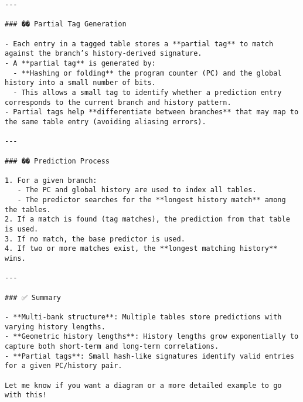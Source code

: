 \documentclass[11pt]{article}
\begin{document}
\begin{verbatim}
---

### �� Partial Tag Generation

- Each entry in a tagged table stores a **partial tag** to match against the branch’s history-derived signature.
- A **partial tag** is generated by:
  - **Hashing or folding** the program counter (PC) and the global history into a small number of bits.
  - This allows a small tag to identify whether a prediction entry corresponds to the current branch and history pattern.
- Partial tags help **differentiate between branches** that may map to the same table entry (avoiding aliasing errors).

---

### �� Prediction Process

1. For a given branch:
   - The PC and global history are used to index all tables.
   - The predictor searches for the **longest history match** among the tables.
2. If a match is found (tag matches), the prediction from that table is used.
3. If no match, the base predictor is used.
4. If two or more matches exist, the **longest matching history** wins.

---

### ✅ Summary

- **Multi-bank structure**: Multiple tables store predictions with varying history lengths.
- **Geometric history lengths**: History lengths grow exponentially to capture both short-term and long-term correlations.
- **Partial tags**: Small hash-like signatures identify valid entries for a given PC/history pair.

Let me know if you want a diagram or a more detailed example to go with this!
\end{verbatim}
\end{document}
